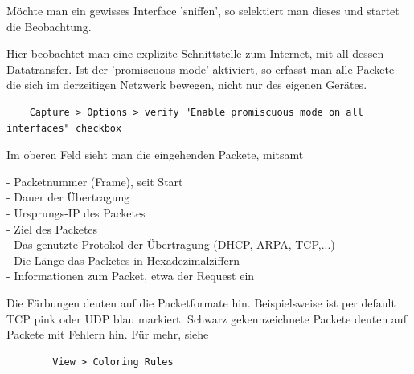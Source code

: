 \documentclass[11pt]{article}
\begin{document}
    Möchte man ein gewisses Interface 'sniffen', so selektiert man dieses und startet die Beobachtung.

    \noindent{}

    Hier beobachtet man eine explizite Schnittstelle zum Internet, mit all dessen Datatransfer.
    Ist der 'promiscuous mode' aktiviert, so erfasst man alle Packete die sich im derzeitigen Netzwerk bewegen, nicht nur des eigenen Gerätes.
\begin{verbatim}
    Capture > Options > verify "Enable promiscuous mode on all interfaces" checkbox
\end{verbatim}
    Im oberen Feld sieht man die eingehenden Packete, mitsamt
    \begin{addmargin}[1em]{1em}
        - Packetnummer (Frame), seit Start\\
        - Dauer der Übertragung\\
        - Ursprungs-IP des Packetes\\
        - Ziel des Packetes\\
        - Das genutzte Protokol der Übertragung (DHCP, ARPA, TCP,...)\\
        - Die Länge das Packetes in Hexadezimalziffern\\
        - Informationen zum Packet, etwa der Request ein\\
    \end{addmargin}
    Die Färbungen deuten auf die Packetformate hin. Beispielsweise ist per default TCP pink oder UDP blau markiert. Schwarz gekennzeichnete Packete deuten auf
    Packete mit Fehlern hin.
    Für mehr, siehe
    \begin{verbatim}
        View > Coloring Rules
    \end{verbatim}
\end{document}
